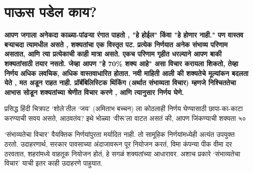 \chapter{पाऊस पडेल काय?}

\textcolor{blue!60!black}{\textbf{आपण जगाला अनेकदा काळ्या-पांढऱ्या रंगात पाहतो , "हे होईल" किंवा "हे होणार नाही." पण वास्तव बऱ्याचदा त्यामधील असते , शक्यतांचा एक विस्तृत पट. प्रत्येक निर्णयात अनेक संभाव्य परिणाम असतात, आणि त्या प्रत्येकाची काही मात्रा असते. एकच परिणाम गृहीत धरल्याने आपण बाकी शक्यतांसाठी तयार नसतो. जेव्हा आपण "हे 70\% शक्य आहे" असा विचार करायला शिकतो, तेव्हा निर्णय अधिक लवचिक, अधिक वास्तवाधारित होतात. नवी माहिती आली की शक्यतेचे मूल्यांकन बदलता येते , मत अडून राहत नाही. प्रॉबॅबिलिस्टिक थिंकिंग (अर्थात संभाव्यता विचार) म्हणजे निश्चिततेचा आभास सोडून शक्यतांच्या श्रेणीत विचार करणे , आणि त्यानुसार निर्णय घेणे.}}

प्रसिद्ध हिंदी चित्रपट ‘शोले’तील ‘जय’ (अमिताभ बच्चन) ला कोठलाही निर्णय घेण्यासाठी छापा-का-काटा करण्याची सवय असते, आठवतंय? इथे भोळ्या ‘वीरू’ला वाटत असतं की, आपण जिंकण्याची शक्यता ५०%

‘संभाव्यतेचा विचार’ वैयक्तिक निर्णयांपुरता मर्यादित नाही. तो सामूहिक निर्णयांमध्येही अत्यंत उपयुक्त ठरतो. उदाहरणार्थ, सरकार पावसाच्या अंदाजावरून पूर नियोजन करतं, विमा कंपन्या पीक वीमा दर ठरवतात, शहरांमध्ये वाहतूक नियोजन होतं, हे सगळं शक्यतांच्या आधारावर. अशाच प्रकारे ‘संभाव्यतेचा विचार’ याची इतर काही उदाहरणे पाहुयात. 

